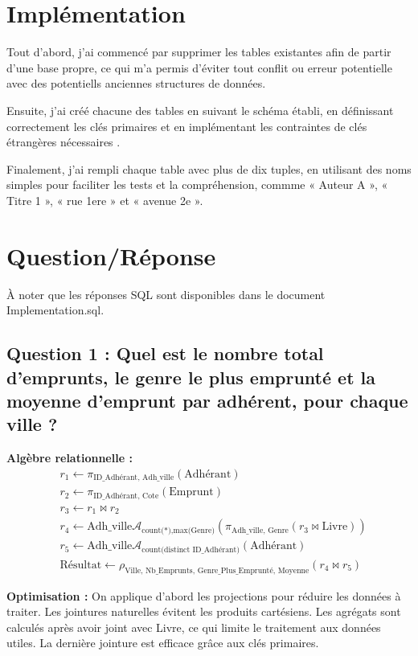 \documentclass[12pt]{article}
\begin{document}
\section*{Implémentation}
Tout d’abord, j’ai commencé par supprimer les tables existantes afin de partir d’une base propre, ce qui m’a permis d’éviter tout conflit ou erreur potentielle avec des potentiells anciennes structures de données. 

Ensuite, j’ai créé chacune des tables en suivant le schéma établi, en définissant correctement les clés primaires et en implémentant les contraintes de clés étrangères nécessaires . 

Finalement, j’ai rempli chaque table avec plus de dix tuples, en utilisant des noms simples pour faciliter les tests et la compréhension, commme « Auteur A », « Titre 1 »,  « rue 1ere » et « avenue 2e ». 


\section*{Question/Réponse}
À noter que les réponses SQL sont disponibles dans le document Implementation.sql.

\subsection*{Question 1 : Quel est le nombre total d’emprunts, le genre le plus emprunté et la moyenne d'emprunt par adhérent, pour chaque ville ?}

\textbf{Algèbre relationnelle :}
\[
\begin{aligned}
  &r_1 \leftarrow \pi_{\text{ID\_Adhérant, Adh\_ville}}(\text{Adhérant}) \\
  &r_2 \leftarrow \pi_{\text{ID\_Adhérant, Cote}}(\text{Emprunt}) \\
  &r_3 \leftarrow r_1 \bowtie r_2 \\
  &r_4 \leftarrow \text{Adh\_ville} \mathcal{A}_{\text{count(*)}, \text{max(Genre)}} (\pi_{\text{Adh\_ville, Genre}}(r_3 \bowtie \text{Livre})) \\
  &r_5 \leftarrow \text{Adh\_ville} \mathcal{A}_{\text{count(distinct ID\_Adhérant)}}(\text{Adhérant}) \\
  &\text{Résultat} \leftarrow \rho_{\text{Ville, Nb\_Emprunts, Genre\_Plus\_Emprunté, Moyenne}}(r_4 \bowtie r_5)
\end{aligned}
\]

\textbf{Optimisation :}  
On applique d’abord les projections pour réduire les données à traiter. Les jointures naturelles évitent les produits cartésiens. Les agrégats sont calculés après avoir joint avec Livre, ce qui limite le traitement aux données utiles. La dernière jointure est efficace grâce aux clés primaires.
\end{document}
